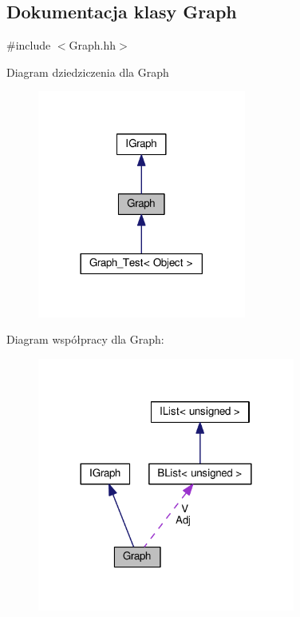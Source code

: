 \hypertarget{class_graph}{\subsection{Dokumentacja klasy Graph}
\label{class_graph}
}


{\ttfamily \#include $<$Graph.\-hh$>$}



Diagram dziedziczenia dla Graph
\nopagebreak
\begin{figure}[H]
\begin{center}
\leavevmode
\includegraphics[width=194pt]{class_graph__inherit__graph}
\end{center}
\end{figure}


Diagram współpracy dla Graph\-:
\nopagebreak
\begin{figure}[H]
\begin{center}
\leavevmode
\includegraphics[width=240pt]{class_graph__coll__graph}
\end{center}
\end{figure}
